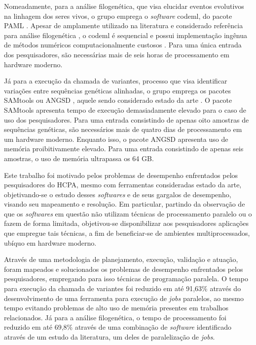 \documentclass[cic,tc]{iiufrgs}
\begin{document}
Nomeadamente, para a análise filogenética, que visa elucidar eventos evolutivos
na linhagem dos seres vivos, o grupo emprega o \textit{software} codeml, do pacote
PAML \cite{yang2007paml}. Apesar de amplamente utilizado na literatura e
considerado referência para análise filogenética \cite{maldonado2016lmap}, o
codeml é sequencial e possui implementação ingênua de métodos numéricos
computacionalmente custosos \cite{yang2020paml}. Para uma única entrada dos
pesquisadores, são necessárias mais de seis horas de processamento em hardware
moderno.

Já para a execução da chamada de variantes, processo que visa identificar
variações entre sequências genéticas alinhadas, o grupo emprega os pacotes
SAMtools \cite{li2009sequence} ou ANGSD \cite{korneliussen2014angsd}, aquele
sendo considerado estado da
arte \cite{poplin2018universal} \cite{yao2020evaluation}. O pacote SAMtools
apresenta tempo de execução demasiadamente elevado para o caso de uso dos
pesquisadores. Para uma entrada consistindo de apenas oito amostras de
sequências genéticas, são necessários mais de quatro dias de processamento em
um hardware moderno. Enquanto isso, o pacote ANGSD apresenta uso de memória
proibitivamente elevado. Para uma entrada consistindo de apenas seis amostras,
o uso de memória ultrapassa os 64 GB.

%
%
Este trabalho foi motivado pelos problemas de desempenho enfrentados pelos
pesquisadores do HCPA, mesmo com ferramentas consideradas estado da arte,
objetivando-se o estudo desses \textit{softwares} e de seus gargalos de
desempenho, visando seu mapeamento e resolução. Em particular, partindo da
observação de que os \textit{softwares} em questão não utilizam técnicas de
processamento paralelo ou o fazem de forma limitada, objetivou-se
disponibilizar aos pesquisadores aplicações que empregue tais técnicas, a fim
de beneficiar-se de ambientes multiprocessados, ubíquo em hardware moderno.

%
%
Através de uma metodologia de planejamento, execução, validação e atuação,
foram mapeados e solucionados os problemas de desempenho enfrentados pelos
pesquisadores, empregando para isso técnicas de programação paralela. O tempo
para execução da chamada de variantes foi reduzido em até 91,63\% através do
desenvolvimento de uma ferramenta para execução de \textit{jobs} paralelos, ao
mesmo tempo evitando problemas de alto uso de memória presentes em trabalhos
relacionados. Já para a análise filogenética, o tempo de processamento foi
reduzido em até 69,8\% através de uma combinação de \textit{software} identificado
através de um estudo da literatura, um deles de paralelização de \textit{jobs}.
\end{document}
